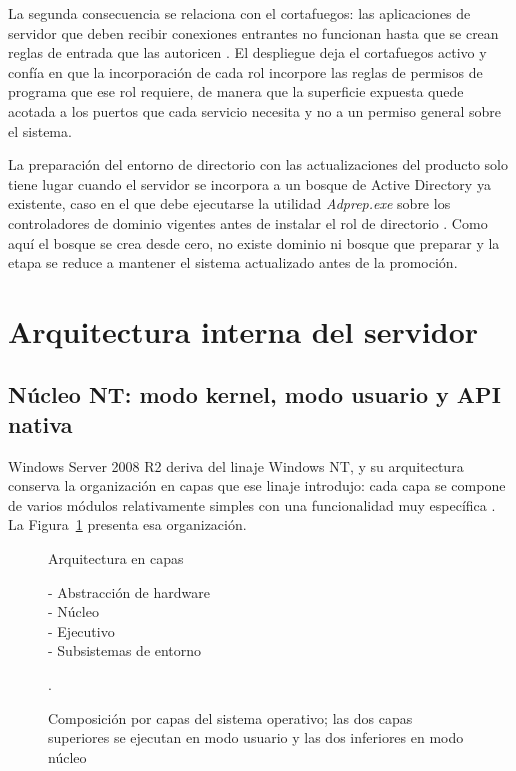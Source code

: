\documentclass[12pt]{article}
\begin{document}
La segunda consecuencia se relaciona con el cortafuegos: las aplicaciones de servidor que deben recibir conexiones entrantes no funcionan hasta que se crean reglas de entrada que las autoricen \parencite{microsoftInstallWs2008r2}. El despliegue deja el cortafuegos activo y confía en que la incorporación de cada rol incorpore las reglas de permisos de programa que ese rol requiere, de manera que la superficie expuesta quede acotada a los puertos que cada servicio necesita y no a un permiso general sobre el sistema.

La preparación del entorno de directorio con las actualizaciones del producto solo tiene lugar cuando el servidor se incorpora a un bosque de Active Directory ya existente, caso en el que debe ejecutarse la utilidad \textit{Adprep.exe} sobre los controladores de dominio vigentes antes de instalar el rol de directorio \parencite{microsoftInstallWs2008r2}. Como aquí el bosque se crea desde cero, no existe dominio ni bosque que preparar y la etapa se reduce a mantener el sistema actualizado antes de la promoción.

\section{Arquitectura interna del servidor}
\label{sec:arquitecturaInterna}

\subsection{Núcleo NT: modo kernel, modo usuario y API nativa}
\label{sec:nucleoNt}

Windows Server 2008 R2 deriva del linaje Windows NT, y su arquitectura conserva la organización en capas que ese linaje introdujo: cada capa se compone de varios módulos relativamente simples con una funcionalidad muy específica \parencite[\S 12.3, p.\ 621]{carretero2001sistemas}. La Figura~\ref{fig:capasWindowsNt} presenta esa organización.

\begin{figure}[htbp]
\centering
\begin{minipage}{0.92\textwidth}
\begin{localsubgroup}
Arquitectura en capas
\begin{localsubgroup}
- Abstracción de hardware \\
- Núcleo \\
- Ejecutivo \\
- Subsistemas de entorno
\end{localsubgroup}
\end{localsubgroup}
\end{minipage}
\caption{Composición por capas del sistema operativo; las dos capas superiores se ejecutan en modo usuario y las dos inferiores en modo núcleo \parencite[\S 12.3, p.\ 621]{carretero2001sistemas}}.
\label{fig:capasWindowsNt}
\end{figure}
\end{document}
